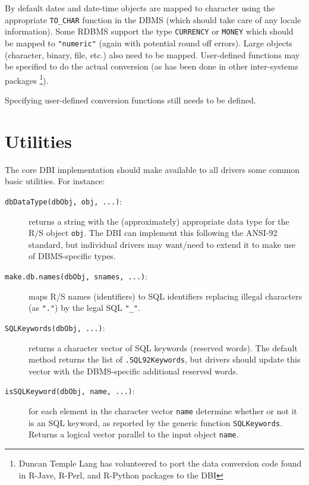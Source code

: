 \documentclass[graphics,times,psfig,dvips,hyper]{article}
\newcommand{\sobj}[1]{\mbox{\tt #1}}    %
\newcommand{\smethod}[1]{\mbox{\tt #1}} %
\begin{document}
By default dates and date-time objects are mapped to character
using the appropriate \texttt{TO\_CHAR} function in the DBMS
(which should take care of any locale information).  Some RDBMS
support the type \texttt{CURRENCY} or \texttt{MONEY} which should be
mapped to \sobj{"numeric"} (again with potential round off errors).
Large objects (character, binary, file, etc.) also need to be mapped.
User-defined functions may be specified to do the actual conversion
(as has been done in other inter-systems packages \footnote{
  Duncan Temple Lang has volunteered to port the data conversion 
  code found in R-Jave, R-Perl, and R-Python packages to the DBI}).

Specifying user-defined conversion functions still needs to be 
defined.

\section{Utilities}\label{sec:utilities}
The core DBI implementation should make available to all
drivers some common basic utilities.  For instance:
\begin{description}
\item[\smethod{dbDataType(dbObj, obj, ...)}:]
  returns a string with the (approximately) appropriate data type for
  the R/S object \sobj{obj}.  The DBI can implement this following
  the ANSI-92 standard, but individual drivers may want/need to extend
  it to make use of DBMS-specific types.

\item[\smethod{make.db.names(dbObj, snames, ...)}:]
  maps R/S names (identifiers) to SQL identifiers replacing 
  illegal characters (as \sobj{"."}) by the legal SQL \sobj{"\_"}.

\item[\sobj{SQLKeywords(dbObj, ...)}:]
  returns a character vector of SQL keywords (reserved words).  
  The default method returns the list of \sobj{.SQL92Keywords},
  but drivers should update this vector with the DBMS-specific
  additional reserved words.

\item[\smethod{isSQLKeyword(dbObj, name, ...)}:]
  for each element in the character vector \sobj{name} determine 
  whether or not it is an SQL keyword, as reported by the 
  generic function \smethod{SQLKeywords}.  Returns a logical vector
  parallel to the input object \sobj{name}.

\end{description}
\end{document}
